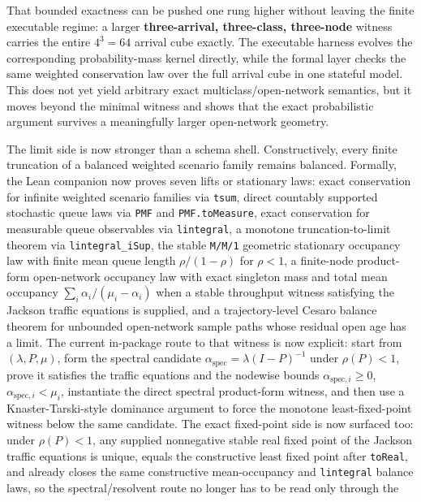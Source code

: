 \documentclass[
  11pt,
]{article}
\begin{document}
That bounded exactness can be pushed one rung higher without leaving the
finite executable regime: a larger \textbf{three-arrival, three-class,
three-node} witness carries the entire \(4^3 = 64\) arrival cube
exactly. The executable harness evolves the corresponding
probability-mass kernel directly, while the formal layer checks the same
weighted conservation law over the full arrival cube in one stateful
model. This does not yet yield arbitrary exact multiclass/open-network
semantics, but it moves beyond the minimal witness and shows that the
exact probabilistic argument survives a meaningfully larger open-network
geometry.

The limit side is now stronger than a schema shell. Constructively,
every finite truncation of a balanced weighted scenario family remains
balanced. Formally, the Lean companion now proves seven lifts or
stationary laws: exact conservation for infinite weighted scenario
families via \texttt{tsum}, direct countably supported stochastic queue
laws via \texttt{PMF} and \texttt{PMF.toMeasure}, exact conservation for
measurable queue observables via \texttt{lintegral}, a monotone
truncation-to-limit theorem via \texttt{lintegral\_iSup}, the stable
\texttt{M/M/1} geometric stationary occupancy law with finite mean queue
length \(\rho/(1-\rho)\) for \(\rho < 1\), a finite-node product-form
open-network occupancy law with exact singleton mass and total mean
occupancy \(\sum_i \alpha_i/(\mu_i-\alpha_i)\) when a stable throughput
witness satisfying the Jackson traffic equations is supplied, and a
trajectory-level Cesaro balance theorem for unbounded open-network
sample paths whose residual open age has a limit. The current in-package
route to that witness is now explicit: start from \((\lambda, P, \mu)\),
form the spectral candidate
\(\alpha_{\mathrm{spec}} = \lambda (I-P)^{-1}\) under \(\rho(P) < 1\),
prove it satisfies the traffic equations and the nodewise bounds
\(\alpha_{\mathrm{spec},i} \ge 0\),
\(\alpha_{\mathrm{spec},i} < \mu_i\), instantiate the direct spectral
product-form witness, and then use a Knaster-Tarski-style dominance
argument to force the monotone least-fixed-point witness below the same
candidate. The exact fixed-point side is now surfaced too: under
\(\rho(P) < 1\), any supplied nonnegative stable real fixed point of the
Jackson traffic equations is unique, equals the constructive least fixed
point after \texttt{toReal}, and already closes the same constructive
mean-occupancy and \texttt{lintegral} balance laws, so the
spectral/resolvent route no longer has to be read only through the
\end{document}
